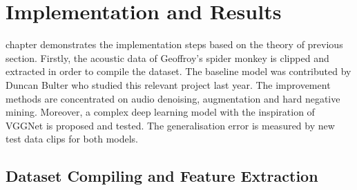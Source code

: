 \chapter{Implementation and Results}
\renewcommand{\baselinestretch}{\mystretch}
\label{chap:results}
 chapter demonstrates the implementation steps based on the theory of previous section. Firstly, the acoustic data of Geoffroy’s spider monkey is clipped and extracted in order to compile the dataset. The baseline model was contributed by Duncan Bulter who studied this relevant project last year. The improvement methods are concentrated on audio denoising, augmentation and hard negative mining. Moreover, a complex deep learning model with the inspiration of VGGNet is proposed and tested. The generalisation error is measured by new test data clips for both models.

\section{Dataset Compiling and Feature Extraction}
